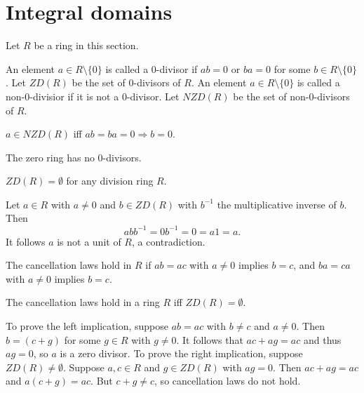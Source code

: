 \documentclass{article}
\begin{document}
\section{Integral domains}
\begin{rema}
	Let \(R\) be a ring in this section.
\end{rema}
\begin{defi}[0-divisor]
	An element \(a\in R\setminus\{0\}\) is called a \(0\)-divisor if \(ab=0\) or \(ba=0\) for some \(b\in R\setminus\{0\}\). Let \(ZD(R)\) be the set of \(0\)-divisors of \(R\). An element \(a\in R\setminus \{0\}\) is called a non-\(0\)-divisior if it is not a \(0\)-divisor. Let \(NZD(R)\) be the set of non-\(0\)-divisors of \(R\).
\end{defi}
\begin{rema}
	\(a\in NZD(R)\) iff \(ab=ba=0\Rightarrow b=0\).
\end{rema}
\begin{rema}
	The zero ring has no \(0\)-divisors.
\end{rema}
\begin{lem}
	\(ZD(R)=\emptyset\) for any division ring \(R\).
	\begin{IEEEproof}
		Let \(a\in R\) with \(a\neq 0\) and \(b\in ZD(R)\) with \(b^{-1}\) the multiplicative inverse of \(b\). Then
		\begin{equation*}
			abb^{-1}=0b^{-1}=0=a1=a.
		\end{equation*}
		It follows \(a\) is not a unit of \(R\), a contradiction.
	\end{IEEEproof}
\end{lem}
\begin{defi}
	The cancellation laws hold in \(R\) if \(ab=ac\) with \(a\neq 0\) implies \(b=c\), and \(ba=ca\) with \(a\neq 0\) implies \(b=c\).
\end{defi}
\begin{thm}
	The cancellation laws hold in a ring \(R\) iff \(ZD(R)=\emptyset\).
	\begin{IEEEproof}
		To prove the left implication, suppose \(ab=ac\) with \(b\neq c\) and \(a\neq 0\). Then \(b=(c+g)\) for some \(g\in R\) with \(g\neq 0\). It follows that \(ac+ag=ac\) and thus \(ag=0\), so \(a\) is a zero divisor. To prove the right implication, suppose \(ZD(R)\neq\emptyset\). Suppose \(a,c\in R\) and \(g\in ZD(R)\) with \(ag=0\). Then \(ac+ag=ac\) and \(a(c+g)=ac\). But \(c+g\neq c\), so cancellation laws do not hold.
	\end{IEEEproof}
\end{thm}
\end{document}
